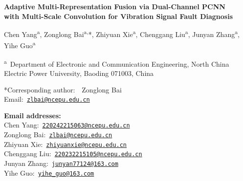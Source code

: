 \documentclass[12pt]{article}
\begin{document}
	
	\begin{center}
		\LARGE \textbf{Adaptive Multi-Representation Fusion via Dual-Channel PCNN\\[4pt]
			with Multi-Scale Convolution for Vibration Signal Fault Diagnosis}
	\end{center}
	
	\vspace{2em}
	
	\begin{center}
		\large
		Chen Yang\textsuperscript{a},
		Zonglong Bai\textsuperscript{a,}*,
		Zhiyuan Xie\textsuperscript{a},
		Chenggang Liu\textsuperscript{a},
		Junyan Zhang\textsuperscript{a},
		Yihe Guo\textsuperscript{a}
	\end{center}
	
	\vspace{1em}
	
	\begin{flushleft}
		\textsuperscript{a}~Department of Electronic and Communication Engineering,
		North China Electric Power University,
		Baoding 071003, China
	\end{flushleft}
	
	\vspace{1em}
	
	\begin{flushleft}
		*Corresponding author:~~Zonglong Bai\\
		\indent\hspace{2.75em}Email:~\href{mailto:zlbai@ncepu.edu.cn}{\texttt{zlbai@ncepu.edu.cn}}
	\end{flushleft}
	
	\vspace{1em}
	
	\begin{flushleft}
		\textbf{Email addresses:}\\
		Chen Yang:~\href{mailto:220242215063@ncepu.edu.cn}{\texttt{220242215063@ncepu.edu.cn}}\\
		Zonglong Bai:~\href{mailto:zlbai@ncepu.edu.cn}{\texttt{zlbai@ncepu.edu.cn}}\\
		Zhiyuan Xie:~\href{mailto:zhiyuanxie@ncepu.edu.cn}{\texttt{zhiyuanxie@ncepu.edu.cn}}\\
		Chenggang Liu:~\href{mailto:220232215105@ncepu.edu.cn}{\texttt{220232215105@ncepu.edu.cn}}\\
		Junyan Zhang:~\href{mailto:junyan77124@163.com}{\texttt{junyan77124@163.com}}\\
		Yihe Guo:~\href{mailto:yihe\_guo@163.com}{\texttt{yihe\_guo@163.com}}
	\end{flushleft}
	
\end{document}
